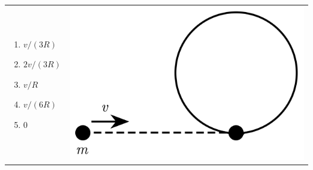 \documentclass[12pt,letterpaper]{article}
\begin{document}
\begin{enumerate}
\begin{tabular}{l r}
\begin{minipage}{0.5\textwidth}
\begin{enumerate}
\item $v/(3R)$
\item $2v/(3R)$
\item $v/R$
\item $v/(6R)$
\item 0
\end{enumerate}
\end{minipage} &
\begin{minipage}{0.4\textwidth}
\includegraphics[width=\textwidth]{hoop.png}
\end{minipage}
\end{tabular}

\end{enumerate}
\end{document}
